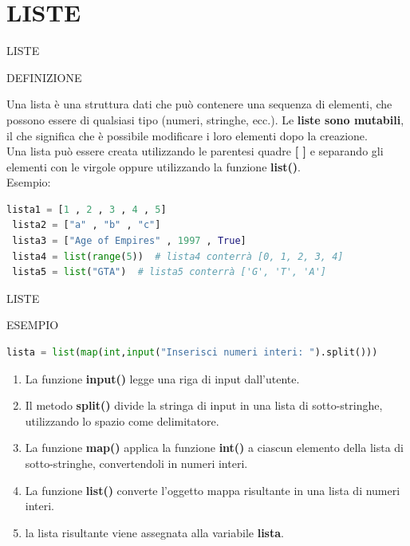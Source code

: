 \documentclass[aspectratio=1610]{beamer}
\begin{document}
\section{LISTE}

\begin{frame}[fragile]{LISTE}
    \begin{alertblock}{DEFINIZIONE}
        \begin{minipage}{0.98\linewidth}
            \justifying
            Una lista è una struttura dati che può contenere una sequenza di elementi, che possono essere 
            di qualsiasi tipo (numeri, stringhe, ecc.). Le \textbf{liste sono mutabili}, il che 
            significa che è possibile modificare i loro elementi dopo la creazione.\\
            Una lista può essere creata utilizzando le parentesi quadre \textbf{[ ]} e separando 
            gli elementi con le virgole oppure utilizzando la funzione \textbf{list()}.\\
            \pause
            Esempio:
\begin{lstlisting}[language=Python]
 lista1 = [1 , 2 , 3 , 4 , 5]
 lista2 = ["a" , "b" , "c"]
 lista3 = ["Age of Empires" , 1997 , True]
 lista4 = list(range(5))  # lista4 conterrà [0, 1, 2, 3, 4]
 lista5 = list("GTA")  # lista5 conterrà ['G', 'T', 'A']
\end{lstlisting}
        \end{minipage}
    \end{alertblock}
\end{frame}

\begin{frame}[fragile]{LISTE}
    \begin{alertblock}{ESEMPIO}
        \begin{minipage}{0.98\linewidth}
\begin{lstlisting}[language=Python]
 lista = list(map(int,input("Inserisci numeri interi: ").split()))
\end{lstlisting}
\pause
\begin{enumerate}
    \item La funzione \textbf{input()} legge una riga di input dall'utente.
    \pause
    \item Il metodo \textbf{split()} divide la stringa di input in una lista di sotto-stringhe, utilizzando lo spazio come delimitatore.
    \pause
    \item La funzione \textbf{map()} applica la funzione \textbf{int()} a ciascun elemento della lista di sotto-stringhe, convertendoli in numeri interi.
    \pause
    \item La funzione \textbf{list()} converte l'oggetto mappa risultante in una lista di numeri interi.
    \pause
    \item la lista risultante viene assegnata alla variabile \textbf{lista}.
\end{enumerate}
        \end{minipage}
    \end{alertblock}
\end{frame}
\end{document}
